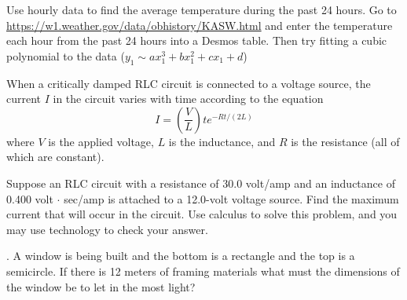 \documentclass[11pt]{exam}
\begin{document}
	\begin{questions}
		
		\addpoints
		
		\question[15]
		Use hourly data to find the average temperature during the past 24 hours.
		Go to \url{https://w1.weather.gov/data/obhistory/KASW.html} and enter the temperature each hour from the past 24 hours into a Desmos table.  Then try fitting a cubic polynomial to the data ($y_1 \sim ax_1^3 + bx_1^2 + cx_1 + d$)
		
		\question[5]
		When a critically damped RLC circuit is connected to a voltage source, the current $I$ in the circuit varies with time according to the equation
		\[I = \left(\frac{V}{L}\right)te^{-Rt/(2L)}\]
		where $V$ is the applied voltage, $L$ is the inductance, and $R$ is the resistance (all of which are constant).
		
		Suppose an RLC circuit with a resistance of 30.0 volt/amp and an inductance of 0.400 volt $\cdot$ sec/amp is attached to a 12.0-volt voltage source. Find the maximum current that will occur in the circuit.  Use calculus to solve this problem, and you may use technology to check your answer.
			
		.	A window is being built and the bottom is a rectangle and the top is a semicircle. If there is 12 meters of framing materials what must the dimensions of the window be to let in the most light?
		

\end{questions}
\end{document}
